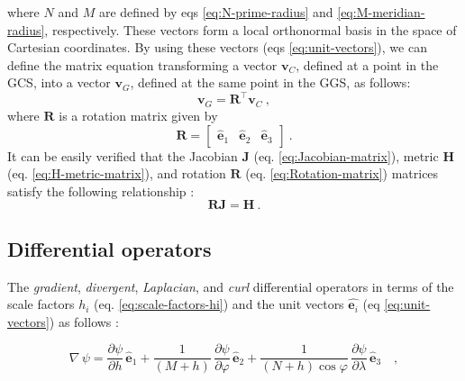 \documentclass[mreferee]{gji}
\begin{document}
where $N$ and $M$ are defined by eqs \ref{eq:N-prime-radius} and
\ref{eq:M-meridian-radius}, respectively.
These vectors form a local orthonormal basis in the space of Cartesian
coordinates.
By using these vectors (eqs \ref{eq:unit-vectors}), we can define the
matrix equation transforming a vector $\mathbf{v}_{C}$, defined at a
point in the GCS, into a vector $\mathbf{v}_{G}$, defined 
at the same point in the GGS, as follows:
\begin{equation} \label{eq:vC-2-vG}
\mathbf{v}_{G} = \mathbf{R}^{\top} \mathbf{v}_{C} \: ,
\end{equation}
where $\mathbf{R}$ is a rotation matrix \citep{soler1976} given by
\begin{equation} \label{eq:Rotation-matrix}
\mathbf{R} = \begin{bmatrix}
\hat{\mathbf{e}}_{1} & \hat{\mathbf{e}}_{2} & \hat{\mathbf{e}}_{3}
\end{bmatrix} \: .
\end{equation}
It can be easily verified that the Jacobian $\mathbf{J}$ (eq. \ref{eq:Jacobian-matrix}),
metric $\mathbf{H}$ (eq. \ref{eq:H-metric-matrix}), and
rotation $\mathbf{R}$ (eq. \ref{eq:Rotation-matrix}) matrices
satisfy the following relationship \citep{soler1976}:
\begin{equation} \label{eq:J-R-H-relationship}
\mathbf{R} \mathbf{J} = \mathbf{H} \: .
\end{equation}


\subsection{Differential operators}


The \textit{gradient}, \textit{divergent}, \textit{Laplacian}, and
\textit{curl} differential operators in terms of the scale factors
$h_{i}$ (eq. \ref{eq:scale-factors-hi})
and the unit vectors $\hat{\mathbf{e}_{i}}$ (eq \ref{eq:unit-vectors})
as follows \citep[e.g.,][]{kellogg1929, hotine1969, arfken2001, sttraton2007}:

\begin{equation} \label{eq:gradient-geodetic}
\nabla \, \psi
= \frac{\partial \psi}{\partial h} \, \hat{\mathbf{e}}_{1} +
\frac{1}{\left( M + h \right)} \, \frac{\partial \psi}{\partial \varphi} \, \hat{\mathbf{e}}_{2} +
\frac{1}{\left( N + h \right) \cos\varphi} \, \frac{\partial \psi}{\partial \lambda} \, \hat{\mathbf{e}}_{3}
\quad ,
\end{equation}

\end{document}
